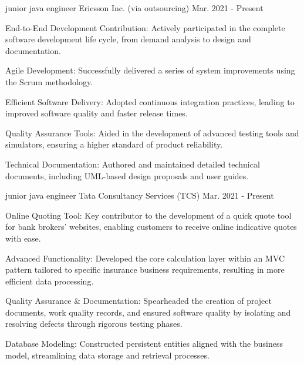 \begin{cventries}
\cventry
  {junior java engineer } %
  {Ericsson Inc. \tiny{(via outsourcing)}} %
  {} %
  {Mar. 2021 - Present} %
  {
    \begin{cvitems} %
      \item {End-to-End Development Contribution: Actively participated in the complete software development life cycle, from demand analysis to design and documentation. }
      \item {Agile Development: Successfully delivered a series of system improvements using the Scrum methodology. }
      \item {Efficient Software Delivery: Adopted continuous integration practices, leading to improved software quality and faster release times.    }
      \item {Quality Assurance Tools: Aided in the development of advanced testing tools and simulators, ensuring a higher standard of product reliability.  }
      \item {Technical Documentation: Authored and maintained detailed technical documents, including UML-based design proposals and user guides.     }
    \end{cvitems}
  }

\cventry
  {junior java engineer } %
  {Tata Consultancy Services (TCS)} %
  {} %
  {Mar. 2021 - Present} %
  {
    \begin{cvitems} %
      \item {Online Quoting Tool: Key contributor to the development of a quick quote tool for bank brokers' websites, enabling customers to receive online indicative quotes with ease. }
      \item {Advanced Functionality: Developed the core calculation layer within an MVC pattern tailored to specific insurance business requirements, resulting in more efficient data processing.}
      \item {Quality Assurance \& Documentation: Spearheaded the creation of project documents, work quality records, and ensured software quality by isolating and resolving defects through rigorous testing phases.  }
      \item {Database Modeling: Constructed persistent entities aligned with the business model, streamlining data storage and retrieval processes. }
    \end{cvitems}
  }

\end{cventries}
